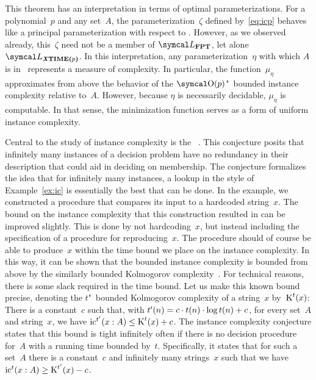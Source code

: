This theorem has an interpretation in terms of optimal parameterizations.
For a polynomial~$p$ and any set~$A$, the parameterization~$\zeta$ defined by~\eqref{eq:icp} behaves like a principal parameterization with respect to .
However, as we observed already, this~$\zeta$ need not be a member of $\calL_\cl{FPT}$, let alone $\calL_\clX{TIME($p$)}$.
In this interpretation, any parameterization~$\eta$ with which $A$ is in~ represents a measure of complexity.
In particular, the function~$\mu_\eta$ approximates from above the behavior of the $\bigO(p)$"~bounded instance complexity relative to~$A$.
However, because $\eta$ is necessarily decidable, $\mu_\eta$ is computable.
In that sense, the minimization function serves as a form of uniform instance complexity.

Central to the study of instance complexity is the ~\parencite{orponen1994instance}.
This conjecture posits that infinitely many instances of a decision problem have no redundancy in their description that could aid in deciding on membership.
The conjecture formalizes the idea that for infinitely many instances, a lookup in the style of Example~\ref{ex:ic} is essentially the best that can be done.
In the example, we constructed a procedure that compares its input to a hardcoded string~$x$.
The bound on the instance complexity that this construction resulted in can be improved slightly.
This is done by not hardcoding~$x$, but instead including the specification of a procedure for reproducing~$x$.
The procedure should of course be able to produce~$x$ within the time bound we place on the instance complexity.
In this way, it can be shown that the bounded instance complexity is bounded from above by the similarly bounded Kolmogorov complexity~\parencite{orponen1994instance,li2008introduction}.
For technical reasons, there is some slack required in the time bound.
Let us make this known bound precise, denoting the $t$"~bounded Kolmogorov complexity of a string~$x$ by~$\operatorname{K}^t(x)$:
There is a constant~$c$ such that, with $t'(n) = c \cdot t(n) \cdot \log t(n) + c$, for every set~$A$ and string~$x$, we have $\operatorname{ic}^{t'}(x : A) \le \operatorname{K}^t(x) + c$.
The instance complexity conjecture states that this bound is tight infinitely often if there is no decision procedure for~$A$ with a running time bounded by~$t$.
Specifically, it states that for such a set~$A$ there is a constant~$c$ and infinitely many strings~$x$ such that we have $\operatorname{ic}^t(x : A) \ge \operatorname{K}^{t'}(x) - c$.

